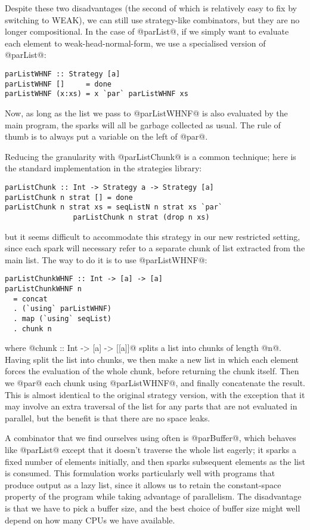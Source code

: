 \documentclass[twocolumn,9pt]{sigplanconf}
\begin{document}
Despite these two disadvantages (the second of which is relatively
easy to fix by switching to WEAK), we can still use strategy-like
combinators, but they are no longer compositional.  
In the case of @parList@, if we simply want to evaluate
each element to weak-head-normal-form, we use a specialised version of
@parList@:

\begin{verbatim}
parListWHNF :: Strategy [a]
parListWHNF []     = done
parListWHNF (x:xs) = x `par` parListWHNF xs
\end{verbatim}
Now, as long as the list we pass to @parListWHNF@ is also evaluated by
the main program, the sparks will all be garbage collected as usual.
The rule of thumb is to always put a variable on the left of @par@.

Reducing the granularity with @parListChunk@ is a common technique;
here is the standard implementation in the strategies library:

\begin{verbatim}
parListChunk :: Int -> Strategy a -> Strategy [a]
parListChunk n strat [] = done
parListChunk n strat xs = seqListN n strat xs `par` 
			    parListChunk n strat (drop n xs)
\end{verbatim}
but it seems difficult to accommodate this strategy in our new
restricted setting, since each spark will necessary refer to a
separate chunk of list extracted from the main list.  The way to do it
is to use @parListWHNF@:

\begin{verbatim}
parListChunkWHNF :: Int -> [a] -> [a]
parListChunkWHNF n
  = concat
  . (`using` parListWHNF)
  . map (`using` seqList)
  . chunk n
\end{verbatim}
where @chunk :: Int -> [a] -> [[a]]@ splits a list into chunks of
length @n@.  Having split the list into chunks, we then make a new
list in which each element forces the evaluation of the whole chunk,
before returning the chunk itself.  Then we @par@ each chunk using
@parListWHNF@, and finally concatenate the result.  This is almost
identical to the original strategy version, with the exception that it
may involve an extra traversal of the list for any parts that are not
evaluated in parallel, but the benefit is that there are no space
leaks.

A combinator that we find ourselves using often is @parBuffer@, which
behaves like @parList@ except that it doesn't traverse the whole list
eagerly; it sparks a fixed number of elements initially, and then
sparks subsequent elements as the list is consumed.  This formulation
works particularly well with programs that produce output as a lazy
list, since it allows us to retain the constant-space property of the
program while taking advantage of parallelism.  The disadvantage is
that we have to pick a buffer size, and the best choice of buffer size
might well depend on how many CPUs we have available.
\end{document}
